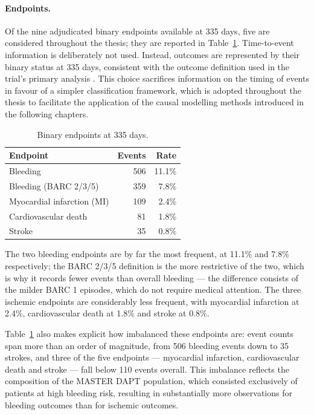 \paragraph{Endpoints.}
Of the nine adjudicated binary endpoints available at 335 days, five are
considered throughout the thesis; they are reported in Table~\ref{tab:endpoints}.
Time-to-event information is deliberately not used. Instead, outcomes are represented by their binary 
status at 335 days, consistent with the outcome definition used in the trial's primary analysis \citep{valgimigli2021masterdapt}.
This choice sacrifices information on the timing of events in favour of a simpler classification 
framework, which is adopted throughout the thesis to facilitate the application of 
the causal modelling methods introduced in the following chapters.

\begin{table}[h]
\centering
\caption{Binary endpoints at 335 days.}
\label{tab:endpoints}
\begin{tabular}{lrr}
\toprule
Endpoint & Events & Rate \\
\midrule
Bleeding                    & 506 & 11.1\% \\
Bleeding (BARC 2/3/5)       & 359 &  7.8\% \\
Myocardial infarction (MI)  & 109 &  2.4\% \\
Cardiovascular death        &  81 &  1.8\% \\
Stroke                      &  35 &  0.8\% \\
\bottomrule
\end{tabular}
\end{table}

The two bleeding endpoints are by far the most frequent, at 11.1\% and 7.8\%
respectively; the BARC 2/3/5 definition is the more restrictive of the two,
which is why it records fewer events than overall bleeding — the difference
consists of the milder BARC 1 episodes, which do not require medical
attention. The three ischemic endpoints are considerably less frequent, with myocardial
infarction at 2.4\%, cardiovascular death at 1.8\% and stroke at 0.8\%.

Table~\ref{tab:endpoints} also makes explicit how imbalanced these endpoints
are: event counts span more than an order of magnitude, from 506 bleeding
events down to 35 strokes, and three of the five endpoints — myocardial
infarction, cardiovascular death and stroke — fall below 110 events overall.
This imbalance reflects the composition of the MASTER DAPT population, which consisted exclusively of patients at 
high bleeding risk, resulting in substantially more observations for bleeding outcomes than for ischemic outcomes.

